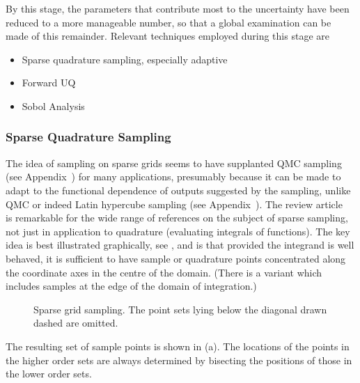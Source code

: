 By this stage, the parameters that contribute most to the uncertainty
have been reduced to a more manageable number, so that a global
examination can be made of this remainder.
Relevant techniques employed during this stage are
\begin{itemize}
\item Sparse quadrature sampling, especially adaptive
\item Forward UQ
\item Sobol Analysis
\end{itemize}

\subsubsection{Sparse Quadrature Sampling}\label{sec:sparse}
The idea of sampling on sparse grids seems to have supplanted QMC sampling (see Appendix~)
for many applications, presumably because it can be made to adapt to the functional
dependence of outputs suggested by the sampling, unlike QMC or indeed Latin hypercube sampling (see Appendix~).
The review article~\cite{Bu04Spar} is remarkable for the wide range of references
on the subject of sparse sampling, not just in application to quadrature (evaluating integrals
of functions). The key idea is best illustrated graphically,
see , and is that provided the integrand is well behaved,
it is sufficient to have sample or quadrature points concentrated along
the coordinate axes in the centre of the domain.
(There is a variant which includes samples at the edge of the
domain of integration.)
\begin{figure}
\centerline{}
\caption{\label{fig:sgridl}
Sparse grid sampling. The point sets lying below the diagonal drawn dashed
are omitted.}
\end{figure}
The resulting set of sample points is shown in (a). The
locations of the points in the higher order sets are always determined
by bisecting the positions of those in the lower order sets.

